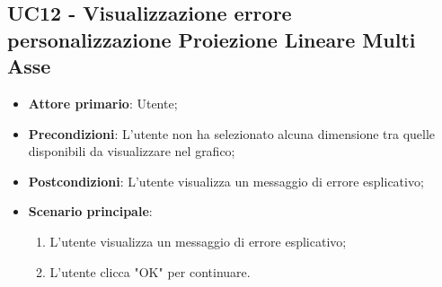 \subsection{UC12 - Visualizzazione errore personalizzazione Proiezione Lineare Multi Asse}
\begin{itemize}
	\item \textbf{Attore primario}: Utente;
	\item \textbf{Precondizioni}: L'utente non ha selezionato alcuna dimensione tra quelle disponibili da visualizzare nel grafico;
	\item \textbf{Postcondizioni}: L'utente visualizza un messaggio di errore esplicativo;
	\item \textbf{Scenario principale}:
		\begin{enumerate}
			\item L'utente visualizza un messaggio di errore esplicativo;
			\item L'utente clicca "OK" per continuare.
		\end{enumerate}
\end{itemize}